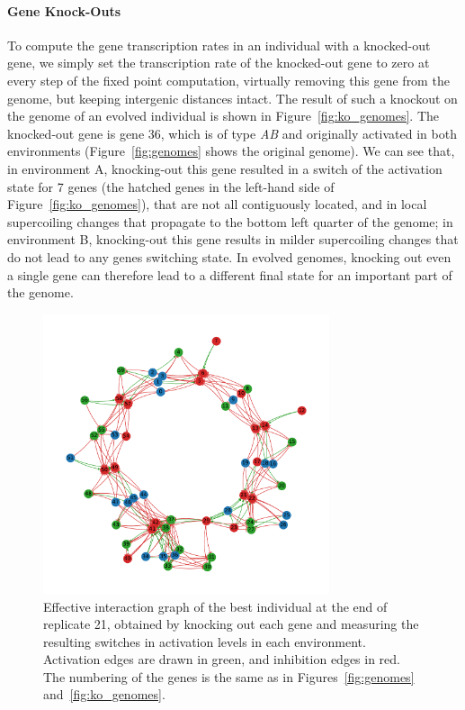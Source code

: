 \paragraph{Gene Knock-Outs}
To compute the gene transcription rates in an individual with a knocked-out gene, we simply set the transcription rate of the knocked-out gene to zero at every step of the fixed point computation, virtually removing this gene from the genome, but keeping intergenic distances intact.
The result of such a knockout on the genome of an evolved individual is shown in Figure~\ref{fig:ko_genomes}.
The knocked-out gene is gene 36, which is of type \emph{AB} and originally activated in both environments (Figure~\ref{fig:genomes} shows the original genome).
We can see that, in environment A, knocking-out this gene resulted in a switch of the activation state for 7 genes (the hatched genes in the left-hand side of Figure~\ref{fig:ko_genomes}), that are not all contiguously located, and in local supercoiling changes that propagate to the bottom left quarter of the genome; in environment B, knocking-out this gene results in milder supercoiling changes that do not lead to any genes switching state.
In evolved genomes, knocking out even a single gene can therefore lead to a different final state for an important part of the genome.

\begin{figure}[H]
  \centering
  \includegraphics[width=0.75\textwidth]{ploscb/img/combined_effective_graph_rep21_graphviz.pdf}
  \caption{Effective interaction graph of the best individual at the end of replicate 21, obtained by knocking out each gene and measuring the resulting switches in activation levels in each environment.
  Activation edges are drawn in green, and inhibition edges in red.
  The numbering of the genes is the same as in Figures~\ref{fig:genomes} and~\ref{fig:ko_genomes}.}
  \label{fig:ko_graph}
\end{figure}

